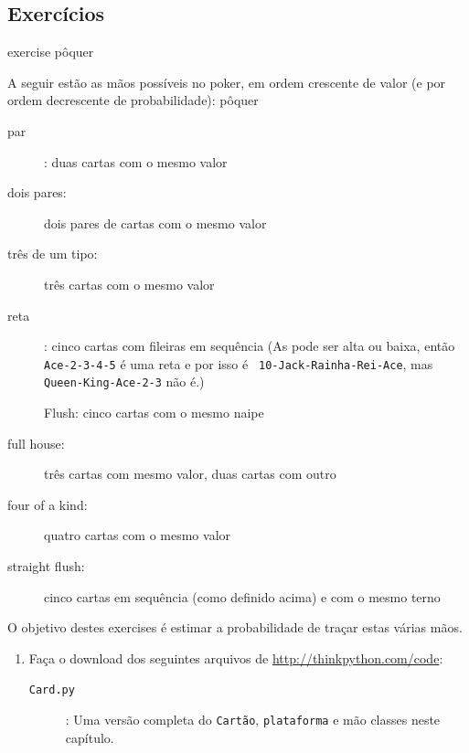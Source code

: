 \documentclass[10pt]{book}
\begin{document}
\begin{exercise}
\begin{v erbatim}
\section{Exercícios}

\begin{} exercise
\label{} pôquer

A seguir estão as mãos possíveis no poker, em ordem crescente
de valor (e por ordem decrescente de probabilidade):
\index{} pôquer

\begin{description}

\item[par]: duas cartas com o mesmo valor
\Vspace {-0.05in}

\item[dois pares:] dois pares de cartas com o mesmo valor
\Vspace {-0.05in}

\item[três de um tipo:] três cartas com o mesmo valor
\Vspace {-0.05in}

\item[reta]: cinco cartas com fileiras em sequência (As pode
ser alta ou baixa, então {\tt Ace-2-3-4-5} é uma reta e por isso é {\tt
10-Jack-Rainha-Rei-Ace}, mas {\tt Queen-King-Ace-2-3} não é.)
\Vspace {-0.05in}

\item[] Flush: cinco cartas com o mesmo naipe
\Vspace {-0.05in}

\item[full house:] três cartas com mesmo valor, duas cartas com outro
\Vspace {-0.05in}

\item[four of a kind:] quatro cartas com o mesmo valor
\Vspace {-0.05in}

\item[straight flush:] cinco cartas em sequência (como definido acima) e
com o mesmo terno
\Vspace {-0.05in}

\end{description}
%
O objetivo destes exercises é estimar
a probabilidade de traçar estas várias mãos.

\begin{enumerate}

\item Faça o download dos seguintes arquivos de \url{http://thinkpython.com/code}:

\begin{description}

\item[{\tt Card.py}]: Uma versão completa do {\tt Cartão},
{\tt plataforma} e {mão \tt} classes neste capítulo.


\end{description}
\end{enumerate}
\end{}
\end{v erbatim}
\end{exercise}
\end{document}

